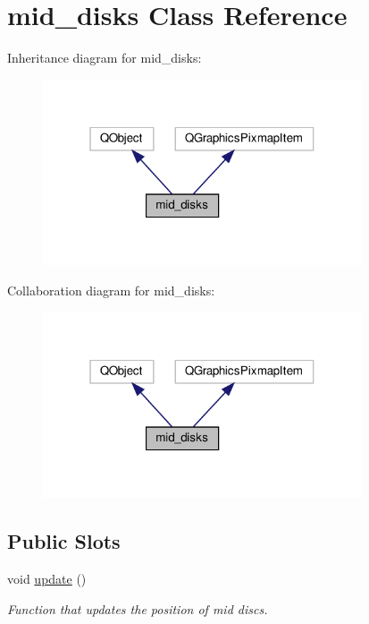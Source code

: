 \hypertarget{classmid__disks}{}\section{mid\+\_\+disks Class Reference}
\label{classmid__disks}


Inheritance diagram for mid\+\_\+disks\+:\nopagebreak
\begin{figure}[H]
\begin{center}
\leavevmode
\includegraphics[width=268pt]{classmid__disks__inherit__graph}
\end{center}
\end{figure}


Collaboration diagram for mid\+\_\+disks\+:\nopagebreak
\begin{figure}[H]
\begin{center}
\leavevmode
\includegraphics[width=268pt]{classmid__disks__coll__graph}
\end{center}
\end{figure}
\subsection*{Public Slots}
\begin{DoxyCompactItemize}
\item 
void \hyperlink{classmid__disks_aaf3ee8a13a79381553589e54b92b691c}{update} ()
\begin{DoxyCompactList}\small\item\em Function that updates the position of mid discs. \end{DoxyCompactList}\end{DoxyCompactItemize}
